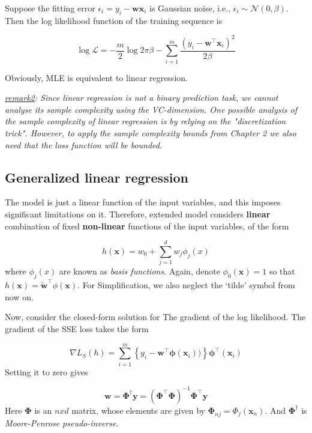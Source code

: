 \documentclass{article}
\begin{document}
	Suppose the fitting error $\epsilon_i = y_i-\mathbf{wx}_i$ is Gaussian noise, i.e., $\epsilon_i \sim\mathcal{N}(0,\beta)$. Then the log likelihood function of the training sequence is
	
	\begin{equation}
	\log \mathcal{L} = -\frac{m}{2} \log 2\pi\beta - \sum_{i=1}^m \frac{(y_i-\mathbf{w}^\top\mathbf{x}_i)^2}{2\beta}
	\end{equation}

	Obviously, MLE is equivalent to linear regression.

	\textit{\underline{remark2}: Since linear regression is not a binary prediction task, we cannot analyse its sample complexity using the VC-dimension. One possible analysis of the sample complexity of linear regression is by relying on the "discretization trick". However, to apply the sample complexity bounds from Chapter 2 we also need that the loss function will be bounded.}
	
	\subsection{Generalized linear regression}
	
	The model is just a linear function of the input variables, and this imposes significant limitations on it. Therefore, extended model considers \textbf{linear} combination of fixed \textbf{non-linear} functions of the input variables, of the form
	
	\begin{equation}
	h(\mathbf{x}) = w_0 + \sum_{j=1}^d w_j \phi_j(x)
	\end{equation}
where $\phi_j(x)$ are known as \textit{basis functions}. Again, denote $\phi_0(\mathbf{x})=1$ so that $h(\mathbf{x}) = \tilde{\mathbf{w}}^\top \phi(\mathbf{x})$. For Simplification, we also neglect the `tilde' symbol from now on.

	Now, consider the closed-form solution for The gradient of the log likelihood. The gradient of the SSE loss takes the form
	
	\begin{equation*}
	\nabla L_S(h) = \sum_{i=1}^m \left\{ y_i - \mathbf{w}^\top \mathbf{\phi} (\mathbf{x}_i)) \right\} \mathbf{\phi}^\top (\mathbf{x}_i)
	\end{equation*}
Setting it to zero gives 

	\begin{equation}
	\label{eqn:mp_solved}
	\mathbf{w} = \mathbf{\Phi}^\dag \mathbf{y} = (\mathbf{\Phi}^\top \mathbf{\Phi})^{-1}\mathbf{\Phi}^\top \mathbf{y}
	\end{equation}
Here $\mathbf{\Phi}$ is an $n x d$ matrix, whose elements are given by $\mathbf{\Phi}_{nj} = \Phi_j(\mathbf{x}_n)$. And $\mathbf{\Phi}^\dag$ is \textit{Moore-Penrose pseudo-inverse}.
\end{document}
